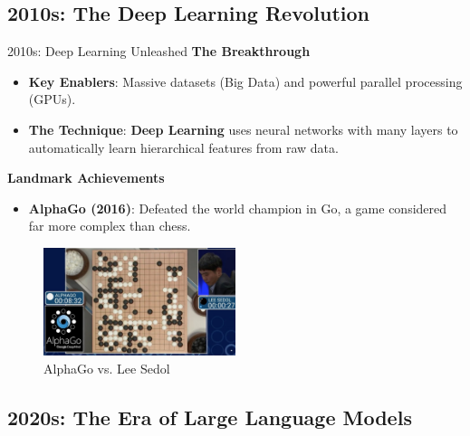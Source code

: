 \documentclass{beamer}
\begin{document}
\subsection{2010s: The Deep Learning Revolution}

\begin{frame}[t]{2010s: Deep Learning Unleashed}
        \textbf{The Breakthrough}
        \begin{itemize}
            \item \textbf{Key Enablers}: Massive datasets (Big Data) and powerful parallel processing (GPUs).
            \item \textbf{The Technique}: \textbf{Deep Learning} uses neural networks with many layers to automatically learn hierarchical features from raw data.
        \end{itemize}
        \textbf{Landmark Achievements}
        \begin{itemize}
            \item \textbf{AlphaGo (2016)}: Defeated the world champion in Go, a game considered far more complex than chess.
        \end{itemize}
        \begin{figure}
            \includegraphics[width=0.5\textwidth]{images/alphago.jpg}
            \caption{AlphaGo vs. Lee Sedol}
        \end{figure}

\end{frame}

\subsection{2020s: The Era of Large Language Models}
\end{document}
